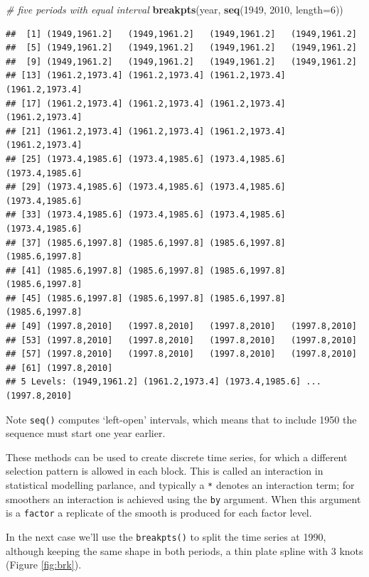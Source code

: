 \documentclass[
]{book}
\newenvironment{Shaded}{\begin{snugshade}}{\end{snugshade}}
\newcommand{\AttributeTok}[1]{\textcolor[rgb]{0.13,0.29,0.53}{#1}}
\newcommand{\CommentTok}[1]{\textcolor[rgb]{0.56,0.35,0.01}{\textit{#1}}}
\newcommand{\DecValTok}[1]{\textcolor[rgb]{0.00,0.00,0.81}{#1}}
\newcommand{\FunctionTok}[1]{\textcolor[rgb]{0.13,0.29,0.53}{\textbf{#1}}}
\newcommand{\NormalTok}[1]{#1}
\begin{document}
\begin{Shaded}
\begin{Highlighting}[]
\CommentTok{\# five periods with equal interval}
\FunctionTok{breakpts}\NormalTok{(year, }\FunctionTok{seq}\NormalTok{(}\DecValTok{1949}\NormalTok{, }\DecValTok{2010}\NormalTok{, }\AttributeTok{length=}\DecValTok{6}\NormalTok{))}
\end{Highlighting}
\end{Shaded}

\begin{verbatim}
##  [1] (1949,1961.2]   (1949,1961.2]   (1949,1961.2]   (1949,1961.2]  
##  [5] (1949,1961.2]   (1949,1961.2]   (1949,1961.2]   (1949,1961.2]  
##  [9] (1949,1961.2]   (1949,1961.2]   (1949,1961.2]   (1949,1961.2]  
## [13] (1961.2,1973.4] (1961.2,1973.4] (1961.2,1973.4] (1961.2,1973.4]
## [17] (1961.2,1973.4] (1961.2,1973.4] (1961.2,1973.4] (1961.2,1973.4]
## [21] (1961.2,1973.4] (1961.2,1973.4] (1961.2,1973.4] (1961.2,1973.4]
## [25] (1973.4,1985.6] (1973.4,1985.6] (1973.4,1985.6] (1973.4,1985.6]
## [29] (1973.4,1985.6] (1973.4,1985.6] (1973.4,1985.6] (1973.4,1985.6]
## [33] (1973.4,1985.6] (1973.4,1985.6] (1973.4,1985.6] (1973.4,1985.6]
## [37] (1985.6,1997.8] (1985.6,1997.8] (1985.6,1997.8] (1985.6,1997.8]
## [41] (1985.6,1997.8] (1985.6,1997.8] (1985.6,1997.8] (1985.6,1997.8]
## [45] (1985.6,1997.8] (1985.6,1997.8] (1985.6,1997.8] (1985.6,1997.8]
## [49] (1997.8,2010]   (1997.8,2010]   (1997.8,2010]   (1997.8,2010]  
## [53] (1997.8,2010]   (1997.8,2010]   (1997.8,2010]   (1997.8,2010]  
## [57] (1997.8,2010]   (1997.8,2010]   (1997.8,2010]   (1997.8,2010]  
## [61] (1997.8,2010]  
## 5 Levels: (1949,1961.2] (1961.2,1973.4] (1973.4,1985.6] ... (1997.8,2010]
\end{verbatim}

Note \texttt{seq()} computes `left-open' intervals, which means that to include 1950 the sequence must start one year earlier.

These methods can be used to create discrete time series, for which a different selection pattern is allowed in each block. This is called an interaction in statistical modelling parlance, and typically a \texttt{*} denotes an interaction term; for smoothers an interaction is achieved using the \texttt{by} argument. When this argument is a \texttt{factor} a replicate of the smooth is produced for each factor level.

In the next case we'll use the \texttt{breakpts()} to split the time series at 1990, although keeping the same shape in both periods, a thin plate spline with 3 knots (Figure \ref{fig:brk}).
\end{document}
